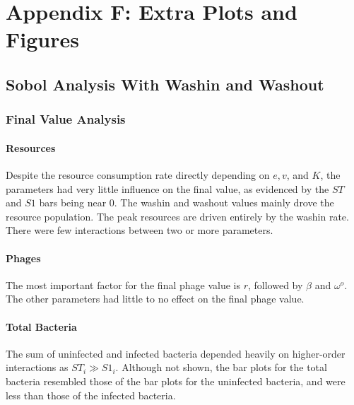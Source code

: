 \chapter{Appendix F: Extra Plots and Figures}
\label{AppendixF}

\section{Sobol Analysis With Washin and Washout}
\label{sec:AppendixF:sobol_analysis_with_washin_and_washout}
\subsection{Final Value Analysis}
\subsubsection{Resources}
Despite the resource consumption rate directly depending on $e, v$, and $K$, the parameters had very little influence on the final value, as evidenced by the $ST$ and $S1$ bars being near 0. 
The washin and washout values mainly drove the resource population. 
The peak resources are driven entirely by the washin rate. 
There were few interactions between two or more parameters. 

\subsubsection{Phages}
The most important factor for the final phage value is $r$, followed by $\beta$ and $\omega^o$. 
The other parameters had little to no effect on the final phage value. 

\subsubsection{Total Bacteria}
The sum of uninfected and infected bacteria depended heavily on higher-order interactions as $ST_i \gg S1_i$. 
Although not shown, the bar plots for the total bacteria resembled those of the bar plots for the uninfected bacteria, and were less than those of the infected bacteria. 


